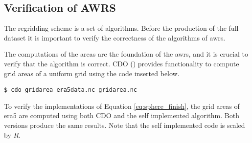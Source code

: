 \subsection{Verification of AWRS}
The regridding scheme is a set of algorithms. Before the production of the full dataset it is important to verify the correctness of the algorithms of \acrshort{awrs}.

The computations of the areas are the foundation of the \acrshort{awrs}, and it is crucial to verify that the algorithm is correct. CDO (\cite{cdo}) provides functionality to compute grid areas of a uniform grid using the code inserted below.
\begin{verbatim}
$ cdo gridarea era5data.nc gridarea.nc     
\end{verbatim}
To verify the implementations of Equation \eqref{eq:sphere_finish}, the grid areas of \acrshort{era5} are computed using both CDO and the self implemented algorithm. Both versions produce the same results.
Note that the self implemented code is scaled by $R$.


